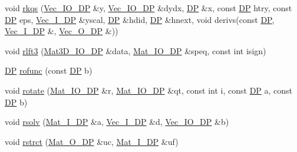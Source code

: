 \begin{DoxyCompactItemize}
void \mbox{\hyperlink{namespaceNR_a07b7b00335709107b531436f32a7cdd8}{rkqs}} (\mbox{\hyperlink{namespaceNR_ab293e06a6bf799d8a7ed932b6852bcb8}{Vec\+\_\+\+I\+O\+\_\+\+DP}} \&y, \mbox{\hyperlink{namespaceNR_ab293e06a6bf799d8a7ed932b6852bcb8}{Vec\+\_\+\+I\+O\+\_\+\+DP}} \&dydx, \mbox{\hyperlink{namespaceNR_af6ff762dd605ff477b8e52387253a02a}{DP}} \&x, const \mbox{\hyperlink{namespaceNR_af6ff762dd605ff477b8e52387253a02a}{DP}} htry, const \mbox{\hyperlink{namespaceNR_af6ff762dd605ff477b8e52387253a02a}{DP}} eps, \mbox{\hyperlink{namespaceNR_a9f943da53862537c552e2a770cb170ae}{Vec\+\_\+\+I\+\_\+\+DP}} \&yscal, \mbox{\hyperlink{namespaceNR_af6ff762dd605ff477b8e52387253a02a}{DP}} \&hdid, \mbox{\hyperlink{namespaceNR_af6ff762dd605ff477b8e52387253a02a}{DP}} \&hnext, void derivs(const \mbox{\hyperlink{namespaceNR_af6ff762dd605ff477b8e52387253a02a}{DP}}, \mbox{\hyperlink{namespaceNR_a9f943da53862537c552e2a770cb170ae}{Vec\+\_\+\+I\+\_\+\+DP}} \&, \mbox{\hyperlink{namespaceNR_a970094d23441f8ef6a45282a7eb2103d}{Vec\+\_\+\+O\+\_\+\+DP}} \&))
\item 
void \mbox{\hyperlink{namespaceNR_a7196d873664bc007122619a6c6ebe6f1}{rlft3}} (\mbox{\hyperlink{namespaceNR_ae2c061d1bcce9ea856c905d761956d76}{Mat3\+D\+\_\+\+I\+O\+\_\+\+DP}} \&data, \mbox{\hyperlink{namespaceNR_ad1513aa4697878ed3bff0b8b3c9dd910}{Mat\+\_\+\+I\+O\+\_\+\+DP}} \&speq, const int isign)
\item 
\mbox{\hyperlink{namespaceNR_af6ff762dd605ff477b8e52387253a02a}{DP}} \mbox{\hyperlink{namespaceNR_a07be599c4e1af3eabb72f2f9c63f8033}{rofunc}} (const \mbox{\hyperlink{namespaceNR_af6ff762dd605ff477b8e52387253a02a}{DP}} b)
\item 
void \mbox{\hyperlink{namespaceNR_a0e1ecebfe787d1724c128b16d547c709}{rotate}} (\mbox{\hyperlink{namespaceNR_ad1513aa4697878ed3bff0b8b3c9dd910}{Mat\+\_\+\+I\+O\+\_\+\+DP}} \&r, \mbox{\hyperlink{namespaceNR_ad1513aa4697878ed3bff0b8b3c9dd910}{Mat\+\_\+\+I\+O\+\_\+\+DP}} \&qt, const int i, const \mbox{\hyperlink{namespaceNR_af6ff762dd605ff477b8e52387253a02a}{DP}} a, const \mbox{\hyperlink{namespaceNR_af6ff762dd605ff477b8e52387253a02a}{DP}} b)
\item 
void \mbox{\hyperlink{namespaceNR_a5bcb5bccdabdf66243c940ae37016e07}{rsolv}} (\mbox{\hyperlink{namespaceNR_a2b8abfda8fffad6ba0a1b5a4c0773dbf}{Mat\+\_\+\+I\+\_\+\+DP}} \&a, \mbox{\hyperlink{namespaceNR_a9f943da53862537c552e2a770cb170ae}{Vec\+\_\+\+I\+\_\+\+DP}} \&d, \mbox{\hyperlink{namespaceNR_ab293e06a6bf799d8a7ed932b6852bcb8}{Vec\+\_\+\+I\+O\+\_\+\+DP}} \&b)
\item 
void \mbox{\hyperlink{namespaceNR_aca06dba4235f41d5484914650537c0a3}{rstrct}} (\mbox{\hyperlink{namespaceNR_adc1f8da33094b6bbeb1f5f899515ce54}{Mat\+\_\+\+O\+\_\+\+DP}} \&uc, \mbox{\hyperlink{namespaceNR_a2b8abfda8fffad6ba0a1b5a4c0773dbf}{Mat\+\_\+\+I\+\_\+\+DP}} \&uf)

\end{DoxyCompactItemize}
